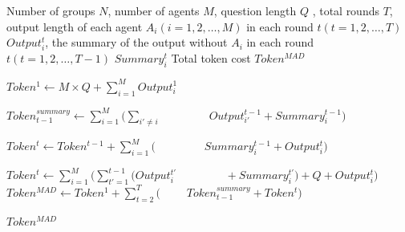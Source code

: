 \begin{algorithm}[t]
    \caption{Token Cost in MAD Methods}
    \label{alg:token_cost_mad}
    \begin{algorithmic}[1]
        \Require Number of groups $N$, number of agents  $M$, question length $Q$ , total rounds $T$,  output length of each agent $A_i(i=1,2, \ldots,M)$ in each round $t(t=1,2,\ldots,T)$ $Output_i^t$, the summary of the output without $A_i$ in each round $t(t=1,2,\ldots,T-1)$ $Summary_i^t$
        \Ensure Total token cost $Token^{MAD}$
        
        \State $Token^{1} \gets M \times Q + \sum_{i=1}^{M} Output_i^1$ 
        \Statex {}
        
            \State $Token^{summary}_{t-1} \gets \sum_{i=1}^{M}(\sum_{i' \neq i}$ 
            \Statex $\qquad \qquad Output_{i'}^{t-1} +  Summary_{i}^{t-1})$ 
            \Statex {}
            
            \State $Token^{t} \gets Token^{t-1}+\sum_{i=1}^{M}($
            \Statex $\qquad \qquad Summary_{i}^{t-1} + Output_{i}^{t})$ 
            
            \State $Token^{t} \gets \sum_{i=1}^{M}(\sum_{t'=1}^{t-1} (Output_i^{t'}$
            \Statex $\qquad\qquad  +Summary_i^{t'})+ Q + Output_{i}^{t})$ 
            \Statex {}
        \EndFor
        \State $Token^{MAD} \gets Token^{1} + \sum_{t=2}^{T} ($
        \Statex $ \qquad Token^{summary}_{t-1}+Token^{t})$
        \Statex {}
        
        \State \Return $Token^{MAD}$
    \end{algorithmic}
\end{algorithm}

